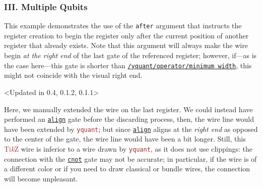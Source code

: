 \documentclass{scrartcl}
\makeatletter
\newenvironment{codeexample*}{%
   \VerbatimEnvironment%
   \let\FVB@VerbatimOut\minted@FVB@VerbatimOut
   \let\FVE@VerbatimOut\minted@FVE@VerbatimOut
   \minted@configlang{tex}%
   \minted@fvset
   \begin{VerbatimOut}[codes={\catcode`\^^I=12},firstline,lastline]{\minted@jobname.pyg}%
}{
   \end{VerbatimOut}%
   \minted@langlinenoson%
   \begin{adjustbox}{center}
       \minted@jobname.pyg %
   \end{adjustbox}\nopagebreak
   \minted@pygmentize{\minted@lang}%
   \minted@langlinenosoff%
   \par%
}
\def\TikZ{\textcolor{brown}{Ti\textit kZ}}
\def\pkg#1{\textcolor{brown}{\texttt{#1}}}
\def\gate#1{\hyperref[gate:#1]{\texttt{#1}}}
\def\style#1{\hyperref[style:#1]{\texttt{#1}}}
\def\Yquant{\pkg{yquant}}
\makeatother
\begin{document}
         \subsubsection{III. Multiple Qubits}
            \begin{example}
               \begin{codeexample*}
               \end{codeexample*}
               This example demonstrates the use of the \texttt{after} argument that instructs the register creation to begin the register only after the current position of another register that already exists.
               Note that this argument will always make the wire begin \emph{at the right end} of the last gate of the referenced register; however, if---as is the case here---this gate is shorter than \style{/yquant/operator/minimum width}, this might not coincide with the visual right end.
            \end{example}

            \clearpage
            \begin{example}<Updated in 0.4, 0.1.2, 0.1.1>
               \begin{codeexample*}
               \end{codeexample*}
               Here, we manually extended the wire on the last register.
               We could instead have performed an \gate{align} gate before the discarding process, then, the wire line would have been extended by \Yquant{}; but since \gate{align} aligns at the \emph{right end} as opposed to the center of the gate, the wire line would have been a bit longer.
               Still, this \TikZ{} wire is inferior to a wire drawn by \Yquant, as it does not use clippings: the connection with the \gate{cnot} gate may not be accurate; in particular, if the wire is of a different color or if you need to draw classical or bundle wires, the connection will become unpleasant.
            \end{example}
\end{document}
